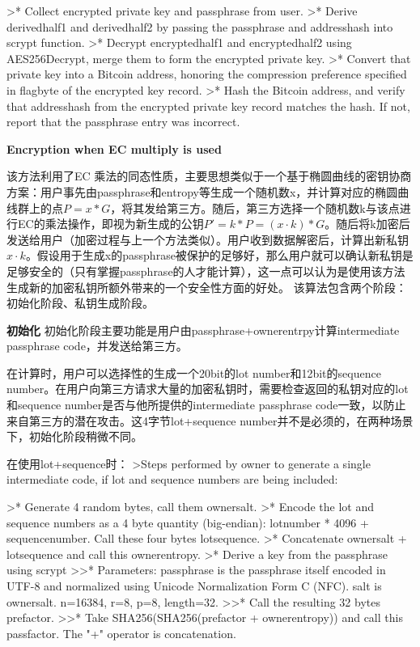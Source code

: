 \documentclass{article}
\begin{document}
>* Collect encrypted private key and passphrase from user.  
>* Derive derivedhalf1 and derivedhalf2 by passing the passphrase and addresshash into scrypt function.  
>* Decrypt encryptedhalf1 and encryptedhalf2 using AES256Decrypt, merge them to form the encrypted private key.  
>* Convert that private key into a Bitcoin address, honoring the compression preference specified in flagbyte of the encrypted key record.  
>* Hash the Bitcoin address, and verify that addresshash from the encrypted private key record matches the hash. If not, report that the passphrase entry was incorrect.  

\textbf{  Encryption when EC multiply is used}

该方法利用了EC 乘法的同态性质，主要思想类似于一个基于椭圆曲线的密钥协商方案：用户事先由passphrase和entropy等生成一个随机数x，并计算对应的椭圆曲线群上的点$P=x*G$，将其发给第三方。随后，第三方选择一个随机数k与该点进行EC的乘法操作，即视为新生成的公钥$P'=k*P=(x \cdot k)*G$。随后将k加密后发送给用户（加密过程与上一个方法类似）。用户收到数据解密后，计算出新私钥$x\cdot k$。假设用于生成x的passphrase被保护的足够好，那么用户就可以确认新私钥是足够安全的（只有掌握passphrase的人才能计算），这一点可以认为是使用该方法生成新的加密私钥所额外带来的一个安全性方面的好处。
该算法包含两个阶段：初始化阶段、私钥生成阶段。

\textbf{ 初始化}
初始化阶段主要功能是用户由passphrase+ownerentrpy计算intermediate passphrase code，并发送给第三方。  

在计算时，用户可以选择性的生成一个20bit的lot number和12bit的sequence number。在用户向第三方请求大量的加密私钥时，需要检查返回的私钥对应的lot和sequence number是否与他所提供的intermediate passphrase code一致，以防止来自第三方的潜在攻击。这4字节lot+sequence number并不是必须的，在两种场景下，初始化阶段稍微不同。 
 
在使用lot+sequence时：  
>Steps performed by owner to generate a single intermediate code, if lot and sequence numbers are being included:  

>* Generate 4 random bytes, call them ownersalt.
>* Encode the lot and sequence numbers as a 4 byte quantity (big-endian): lotnumber * 4096 + sequencenumber. Call these four bytes lotsequence.
>* Concatenate ownersalt + lotsequence and call this ownerentropy.
>* Derive a key from the passphrase using scrypt  
>>* Parameters: passphrase is the passphrase itself encoded in UTF-8 and normalized using Unicode Normalization Form C (NFC). salt is ownersalt. n=16384, r=8, p=8, length=32.
>>* Call the resulting 32 bytes prefactor.
>>* Take SHA256(SHA256(prefactor + ownerentropy)) and call this passfactor. The "+" operator is concatenation.  
\end{document}
